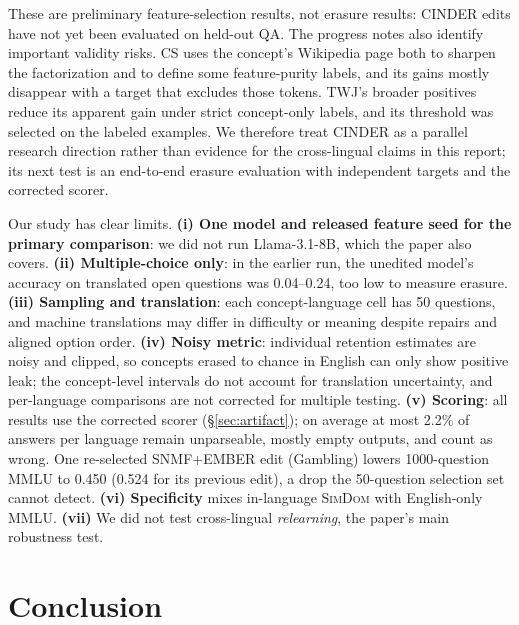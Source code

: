 \documentclass[11pt]{article}
\begin{document}
These are preliminary feature-selection results, not erasure results: CINDER edits have not yet been evaluated on held-out QA. The progress notes also identify important validity risks. CS uses the concept's Wikipedia page both to sharpen the factorization and to define some feature-purity labels, and its gains mostly disappear with a target that excludes those tokens. TWJ's broader positives reduce its apparent gain under strict concept-only labels, and its threshold was selected on the labeled examples. We therefore treat CINDER as a parallel research direction rather than evidence for the cross-lingual claims in this report; its next test is an end-to-end erasure evaluation with independent targets and the corrected scorer.

Our study has clear limits.
\textbf{(i) One model and released feature seed for the primary comparison}: we did not run Llama-3.1-8B, which the paper also covers.
\textbf{(ii) Multiple-choice only}: in the earlier run, the unedited model's accuracy on translated open questions was 0.04--0.24, too low to measure erasure.
\textbf{(iii) Sampling and translation}: each concept-language cell has 50 questions, and machine translations may differ in difficulty or meaning despite repairs and aligned option order.
\textbf{(iv) Noisy metric}: individual retention estimates are noisy and clipped, so concepts erased to chance in English can only show positive leak; the concept-level intervals do not account for translation uncertainty, and per-language comparisons are not corrected for multiple testing.
\textbf{(v) Scoring}: all results use the corrected scorer (\S\ref{sec:artifact}); on average at most 2.2\% of answers per language remain unparseable, mostly empty outputs, and count as wrong. One re-selected SNMF+EMBER edit (Gambling) lowers 1000-question MMLU to 0.450 (0.524 for its previous edit), a drop the 50-question selection set cannot detect.
\textbf{(vi) Specificity} mixes in-language \textsc{SimDom} with English-only MMLU.
\textbf{(vii)} We did not test cross-lingual \emph{relearning}, the paper's main robustness test.

\section{Conclusion}
\end{document}
